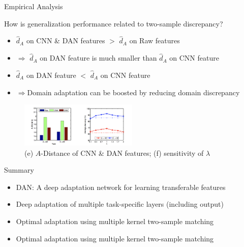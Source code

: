 \documentclass{beamer}
\begin{document}
\begin{frame}[fragile]{Empirical Analysis}
\begin{block}{How is generalization performance related to two-sample discrepancy?}
\begin{itemize}
\item{$\hat{d}_A$ on CNN \& DAN features $>$ $\hat{d}_A$ on Raw features}
\item{$\Rightarrow$ $\hat{d}_A$ on DAN feature is much smaller than $\hat{d}_A$ on CNN feature}
\item{$\hat{d}_A$ on DAN feature $<$ $\hat{d}_A$ on CNN feature}
\item{$\Rightarrow$Domain adaptation can be boosted by reducing domain discrepancy}
\end{itemize}
\end{block}
\begin{figure}[h]
    \centering
    \includegraphics[width=0.5\textwidth]{fig6}
    \caption{ (e) $A$-Distance of CNN \& DAN features; (f) sensitivity of $\lambda$}
    \label{fig:mesh2}
\end{figure}
\end{frame}

\begin{frame}[fragile]{Summary}
\begin{itemize}
\item{DAN: A deep adaptation network for learning transferable features}
\item{Deep adaptation of multiple task-specific layers (including output)}
\item{Optimal adaptation using multiple kernel two-sample matching}
\item{Optimal adaptation using multiple kernel two-sample matching}
\end{itemize}
\end{frame}
\end{document}
